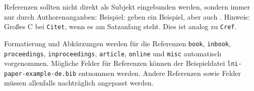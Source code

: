 \documentclass[utf8,biblatex]{lni}
\begin{document}
Referenzen sollten nicht direkt als Subjekt eingebunden werden, sondern immer nur durch Authorenanganben:
Beispiel:  geben ein Beispiel, aber auch \citet{Az09}.
Hinweis: Großes C bei \texttt{Citet}, wenn es am Satzanfang steht. Dies ist analog zu \texttt{Cref}.

Formatierung und Abkürzungen werden für die Referenzen \texttt{book}, \texttt{inbook}, \texttt{proceedings}, \texttt{inproceedings}, \texttt{article}, \texttt{online} und \texttt{misc} automatisch vorgenommen.
Mögliche Felder für Referenzen können der Beispieldatei \texttt{lni-paper-example-de.bib} entnommen werden.
Andere Referenzen sowie Felder müssen allenfalls nachträglich angepasst werden.
\end{document}
